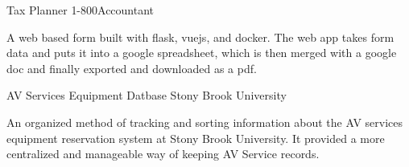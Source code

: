 


\begin{cventries}


\cventry
{Tax Planner} %
{1-800Accountant} %
{}
{}
{%
\begin{cvitems}
\item {A web based form built with flask, vuejs, and docker. The web app takes form data and puts it into a google spreadsheet, which is then merged with a google doc and finally exported and downloaded as a pdf.}
\end{cvitems}
}


\cventry
{AV Services Equipment Datbase} %
{Stony Brook University} %
{}
{}
{%
\begin{cvitems}
\item {An organized method of tracking and sorting information about the AV services equipment reservation system at Stony Brook University. It provided a more centralized and manageable way of keeping AV Service records.}
\end{cvitems}
}


\end{cventries}
